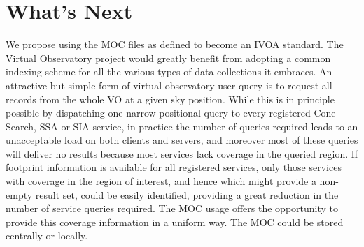 \section{What's Next}

We propose using the MOC files as defined to become an IVOA standard. The Virtual Observatory project would greatly benefit from adopting a common indexing scheme for all the various types of data collections it embraces. An attractive but simple form of virtual observatory user query is to request all records from the whole VO at a given sky position. While this is in principle possible by dispatching one narrow positional query to every registered Cone Search, SSA or SIA service, in practice the number of queries required leads to an unacceptable load on both clients and servers, and moreover most of these queries will deliver no results because most services lack coverage in the queried region. If footprint information is available for all registered services, only those services with coverage in the region of interest, and hence which might provide a non-empty result set, could be easily identified, providing a great reduction in the number of service queries required. The MOC usage offers the opportunity to provide this coverage information in a uniform way. The MOC could be stored centrally or locally.


